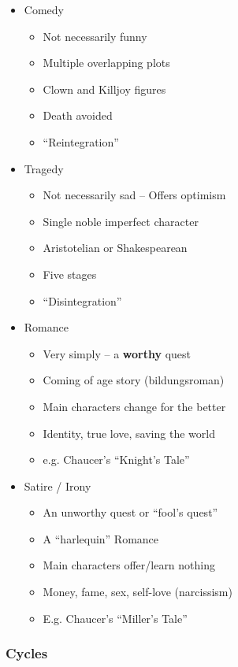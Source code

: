 \documentclass[11pt]{article}
\begin{document}
\begin{itemize}
\item Comedy
\label{sec:orga1a6b9f}
\begin{itemize}
\item Not necessarily funny
\item Multiple overlapping plots
\item Clown and Killjoy figures
\item Death avoided
\item ``Reintegration''
\end{itemize}

\item Tragedy
\label{sec:org626c29b}
\begin{itemize}
\item Not necessarily sad -- Offers optimism
\item Single noble imperfect character
\item Aristotelian or Shakespearean
\item Five stages
\item ``Disintegration''
\end{itemize}

\item Romance
\label{sec:org379da7e}
\begin{itemize}
\item Very simply -- a \textbf{worthy} quest
\item Coming of age story (bildungsroman)
\item Main characters change for the better
\item Identity, true love, saving the world
\item e.g. Chaucer's ``Knight's Tale''
\end{itemize}

\item Satire / Irony
\label{sec:org38c241c}
\begin{itemize}
\item An unworthy quest or ``fool's quest''
\item A ``harlequin'' Romance
\item Main characters offer/learn nothing
\item Money, fame, sex, self-love (narcissism)
\item E.g. Chaucer's ``Miller's Tale''
\end{itemize}
\end{itemize}

\subsubsection*{Cycles}
\label{sec:org4d18741}
\end{document}
